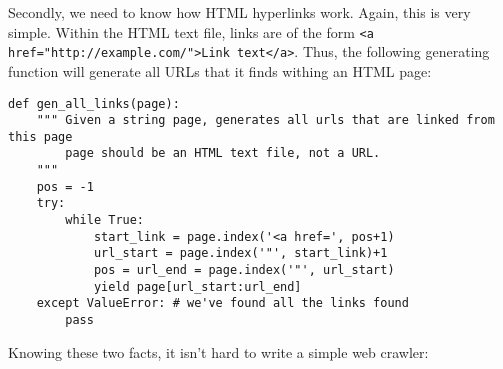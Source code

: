 Secondly, we need to know how HTML hyperlinks work. Again, this is very simple. Within the HTML text file, links are of the form \texttt{<a href="http://example.com/">Link text</a>}. Thus, the following generating function will generate all URLs that it finds withing an HTML page:
\begin{lstlisting}
def gen_all_links(page):
    """ Given a string page, generates all urls that are linked from this page
        page should be an HTML text file, not a URL.
    """
    pos = -1
    try:
        while True:
            start_link = page.index('<a href=', pos+1)
            url_start = page.index('"', start_link)+1
            pos = url_end = page.index('"', url_start)
            yield page[url_start:url_end]
    except ValueError: # we've found all the links found
        pass
\end{lstlisting}

Knowing these two facts, it isn't hard to write a simple web crawler: %


